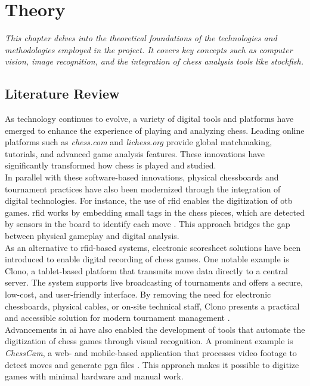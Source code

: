 \chapter{Theory}
\label{chp:theory}

\begin{center}
    \textit{This chapter delves into the theoretical foundations of the technologies and methodologies employed in the project. It covers key concepts such as computer vision, image recognition, and the integration of chess analysis tools like \Gls{stockfish}.}    
\end{center}

\section{Literature Review}
\label{sec:literature-review}

As technology continues to evolve, a variety of digital tools and platforms have emerged to enhance the experience of playing and analyzing chess. Leading online platforms such as \textit{chess.com} and \textit{lichess.org} provide global matchmaking, tutorials, and advanced game analysis features. These innovations have significantly transformed how chess is played and studied. \\

In parallel with these software-based innovations, physical chessboards and tournament practices have also been modernized through the integration of digital technologies. For instance, the use of \gls{rfid} enables the digitization of \gls{otb} games. \gls{rfid} works by embedding small tags in the chess pieces, which are detected by sensors in the board to identify each move \cite{quora:shah}. This approach bridges the gap between physical gameplay and digital analysis. \\

As an alternative to \gls{rfid}-based systems, electronic scoresheet solutions have been introduced to enable digital recording of chess games. One notable example is Clono, a tablet-based platform that transmits move data directly to a central server. The system supports live broadcasting of tournaments and offers a secure, low-cost, and user-friendly interface. By removing the need for electronic chessboards, physical cables, or on-site technical staff, Clono presents a practical and accessible solution for modern tournament management \cite{clono}. \\

Advancements in \gls{ai} have also enabled the development of tools that automate the digitization of chess games through visual recognition. A prominent example is \textit{ChessCam}, a web- and mobile-based application that processes video footage to detect moves and generate \gls{pgn} files \cite{github:chesscam, lichess:chesscam}. This approach makes it possible to digitize games with minimal hardware and manual work.

